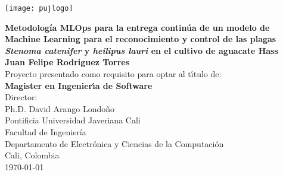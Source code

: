 \begin{center}
\thispagestyle{empty}
\vspace*{0cm}
\begin{center}
    \texttt{[image: pujlogo]}~\\[1.75cm]
\end{center}
\textbf{\fontsize{11}{12}\selectfont
Metodología MLOps para la entrega continúa de un modelo de Machine Learning para el reconocimiento y control de las plagas \textit{Stenoma catenifer} y \textit{heilipus lauri} en el cultivo de aguacate Hass}\\[1.75cm]
\normalsize\textbf{Juan Felipe Rodriguez Torres}\\[1.5cm]
\small Proyecto presentado como requisito para optar al
t\'{\i}tulo de:\\
\textbf{Magister en Ingenier\'{\i}a de Software}\\[1.5cm]
Director:\\
Ph.D. David Arango Londoño\\[1.6cm]

Pontificia Universidad Javeriana Cali\\
Facultad de Ingeniería\\
Departamento de Electrónica y Ciencias de la Computación\\
Cali, Colombia\\
\today\\
\end{center}
